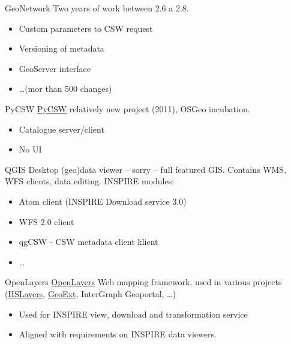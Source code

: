 \documentclass[xcolor=dvipsnames]{beamer}
\begin{document}
\begin{frame}{GeoNetwork}
Two years of work between 2.6 a 2.8.
    \begin{itemize}
        \item Custom parameters to CSW request
        \item Versioning of metadata
        \item GeoServer interface
        \item \dots (mor than 500 changes)
    \end{itemize}
\end{frame}

\begin{frame}{PyCSW}
    \href{http://pycsw.org}{PyCSW} relatively new project (2011), OSGeo
    incubation. 
    \begin{itemize}
        \item Catalogue server/client
        \item No UI
    \end{itemize}
\end{frame}

\begin{frame}{QGIS}
    Desktop (geo)data viewer -- sorry -- full featured GIS. Contains WMS, WFS
    clients, data editing.
    INSPIRE modules:
    \begin{itemize}
        \item Atom client (INSPIRE Download service 3.0)
        \item WFS 2.0 client
        \item qgCSW - CSW metadata client klient
        \item \dots
    \end{itemize}
\end{frame}

\begin{frame}{OpenLayers}
    \href{http://openlayers.org}{OpenLayers} Web mapping framework, used in
    various projects (\href{http://hslayers.org}{HSLayers},
    \href{http://geoext.org}{GeoExt}, InterGraph Geoportal, \dots)

    \begin{itemize}
        \item Used for INSPIRE view, download and transformation service
        \item Aligned with requirements on INSPIRE data viewers.
    \end{itemize}

\end{frame}
\end{document}
